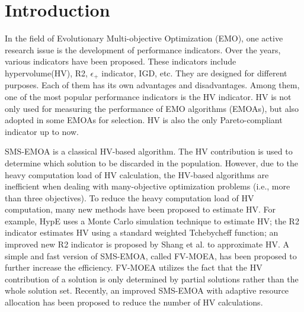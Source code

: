 \documentclass[conference]{IEEEtran}
\begin{document}
\section{Introduction}
In the field of Evolutionary Multi-objective Optimization (EMO), 
one active research issue is the development of performance indicators. 
Over the years, various indicators have been proposed. 
These indicators include hypervolume(HV)\cite{hypervolume}, 
R2\cite{R2}, $\epsilon_+$ indicator\cite{e+}, IGD\cite{IGD}, etc.
They are designed for different purposes. 
Each of them has its own advantages and disadvantages.
Among them, one of the most popular performance indicators is the HV indicator. 
HV is not only used for measuring the performance of EMO algorithms (EMOAs), 
but also adopted in some EMOAs for selection. 
HV is also the only Pareto-compliant indicator up to now\cite{pareto_compliant}. 

SMS-EMOA\cite{smsemoa} is a classical HV-based algorithm. 
The HV contribution is used to determine which solution to be discarded in the population. 
However, due to the heavy computation load of HV calculation, 
the HV-based algorithms are inefficient when dealing with many-objective optimization problems (i.e., more than three objectives). 
To reduce the heavy computation load of HV computation, 
many new methods have been proposed to estimate HV. 
For example, HypE uses a Monte Carlo simulation technique to estimate HV\cite{HypE}; 
the R2 indicator estimates HV using a standard weighted Tchebycheff function\cite{R2}; 
an improved new R2 indicator is proposed by Shang et al.\cite{newR2} to approximate HV.  
A simple and fast version of SMS-EMOA, called FV-MOEA\cite{FVEMOA}, has been proposed to further increase the efficiency.
FV-MOEA utilizes the fact that 
the HV contribution of a solution is only determined by partial solutions rather than the whole solution set\cite{FVEMOA}. 
Recently, an improved SMS-EMOA with adaptive resource allocation has been proposed to reduce the number of HV calculations\cite{ismsemoa}. 
\end{document}
